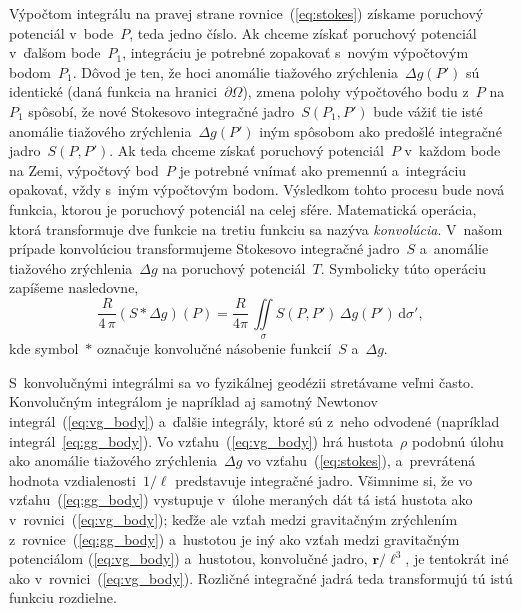 \documentclass[a4paper,12pt]{book}
\newcommand{\diff}{\mathrm d}
\let\vec\mathbf
\begin{document}
Výpočtom integrálu na pravej strane rovnice~(\ref{eq:stokes}) získame poruchový 
potenciál v~bode~$P$, teda jedno číslo.  Ak chceme získať poruchový potenciál 
v~ďalšom bode~$P_1$, integráciu je potrebné zopakovať s~novým výpočtovým 
bodom~$P_1$.  Dôvod je ten, že hoci anomálie tiažového zrýchlenia~$\Delta 
g(P')$ sú identické (daná funkcia na hranici~$\partial\Omega$), zmena polohy 
výpočtového bodu z~$P$ na~$P_1$ spôsobí, že nové Stokesovo integračné 
jadro~$S(P_1, P')$ bude vážiť tie isté anomálie tiažového zrýchlenia~$\Delta 
g(P')$ iným spôsobom ako predošlé integračné jadro~$S(P, P')$.  Ak teda chceme 
získať poruchový potenciál~$P$ v~každom bode na Zemi, výpočtový bod~$P$ je 
potrebné vnímať ako premennú a~integráciu opakovať, vždy s~iným výpočtovým 
bodom.  Výsledkom tohto procesu bude nová funkcia, ktorou je poruchový 
potenciál na celej sfére.  Matematická operácia, ktorá transformuje dve funkcie 
na tretiu funkciu sa nazýva \emph{konvolúcia}.  V~našom prípade konvolúciou 
transformujeme Stokesovo integračné jadro~$S$ a~anomálie tiažového 
zrýchlenia~$\Delta g$ na poruchový potenciál~$T$.  Symbolicky túto operáciu 
zapíšeme nasledovne,
%
\begin{equation}
\label{eq:stokes_convolution}
\frac{R}{4 \, \pi}(S * \Delta g)(P) = \frac{R}{4\pi} \, \iint\limits_\sigma 
S(P, P') \, \Delta g(P') \, \diff\sigma'{,}
\end{equation}
%
kde symbol~$*$ označuje konvolučné násobenie funkcií~$S$ a~$\Delta g$.

S~konvolučnými integrálmi sa vo fyzikálnej geodézii stretávame veľmi často.  
Konvolučným integrálom je napríklad aj samotný Newtonov 
integrál~(\ref{eq:vg_body}) a~ďalšie integrály, ktoré sú z~neho odvodené 
(napríklad integrál~\ref{eq:gg_body}).  Vo vzťahu~(\ref{eq:vg_body}) hrá 
hustota~$\rho$ podobnú úlohu ako anomálie tiažového zrýchlenia~$\Delta g$ vo 
vzťahu~(\ref{eq:stokes}), a~prevrátená hodnota vzdialenosti~$1 \slash \ell$ 
predstavuje integračné jadro.  Všimnime si, že vo vzťahu~(\ref{eq:gg_body}) 
vystupuje v~úlohe meraných dát tá istá hustota ako 
v~rovnici~(\ref{eq:vg_body}); keďže ale vzťah medzi gravitačným zrýchlením 
z~rovnice~(\ref{eq:gg_body}) a~hustotou je iný ako vzťah medzi gravitačným 
potenciálom (\ref{eq:vg_body}) a~hustotou, konvolučné jadro, $\vec r \slash 
\ell^3$, je tentokrát iné ako v~rovnici~(\ref{eq:vg_body}).  Rozličné 
integračné jadrá teda transformujú tú istú funkciu rozdielne.
\end{document}
